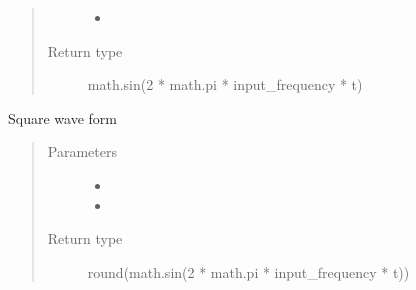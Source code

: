 \documentclass[letterpaper,10pt,english]{sphinxmanual}
\begin{document}
\begin{fulllineitems}
\begin{fulllineitems}
\begin{quote}
\begin{description}
\begin{itemize}
\item {} 
\sphinxAtStartPar
{} \textendash{} 

\end{itemize}

\item[{Return type}] \leavevmode
\sphinxAtStartPar
math.sin(2 * math.pi * input\_frequency * t)

\end{description}\end{quote}

\end{fulllineitems}


\begin{fulllineitems}
\label{\detokenize{dpav:dpav.audio.wave_table.square}}
\pysigstartsignatures
{}
\pysigstopsignatures
\sphinxAtStartPar
Square wave form
\begin{quote}\begin{description}
\item[{Parameters}] \leavevmode\begin{itemize}
\item {} 
\sphinxAtStartPar
{} \textendash{} 

\item {} 
\sphinxAtStartPar
{} \textendash{} 

\end{itemize}

\item[{Return type}] \leavevmode
\sphinxAtStartPar
round(math.sin(2 * math.pi * input\_frequency * t))

\end{description}\end{quote}

\end{fulllineitems}



\end{fulllineitems}
\end{document}
